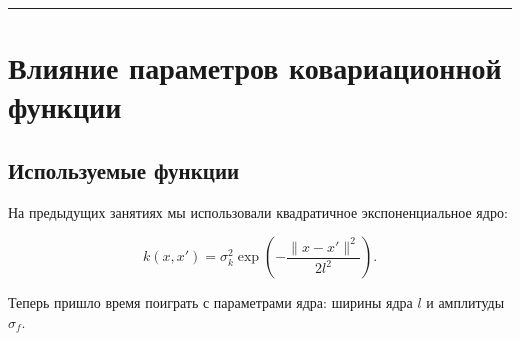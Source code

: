 \documentclass[11pt,a4paper]{article}
\begin{document}
    \begin{center}
    \end{center}

    \begin{center}
    \end{center}

    \begin{center}
    \end{center}

    \begin{center}\rule{0.5\linewidth}{0.5pt}\end{center}

    \hypertarget{ux432ux43bux438ux44fux43dux438ux435-ux43fux430ux440ux430ux43cux435ux442ux440ux43eux432-ux43aux43eux432ux430ux440ux438ux430ux446ux438ux43eux43dux43dux43eux439-ux444ux443ux43dux43aux446ux438ux438}{%
\section{Влияние параметров ковариационной
функции}\label{ux432ux43bux438ux44fux43dux438ux435-ux43fux430ux440ux430ux43cux435ux442ux440ux43eux432-ux43aux43eux432ux430ux440ux438ux430ux446ux438ux43eux43dux43dux43eux439-ux444ux443ux43dux43aux446ux438ux438}}

    \hypertarget{ux438ux441ux43fux43eux43bux44cux437ux443ux435ux43cux44bux435-ux444ux443ux43dux43aux446ux438ux438}{%
\subsection{Используемые
функции}\label{ux438ux441ux43fux43eux43bux44cux437ux443ux435ux43cux44bux435-ux444ux443ux43dux43aux446ux438ux438}}

На предыдущих занятиях мы использовали квадратичное экспоненциальное
ядро:

\[
  k(x, x') = \sigma_k^2 \exp{ \left( -\frac{\lVert x - x' \rVert^2}{2l^2} \right) }.
\]

Теперь пришло время поиграть с параметрами ядра: ширины ядра \(l\) и
амплитуды \(\sigma_f\).
\end{document}
